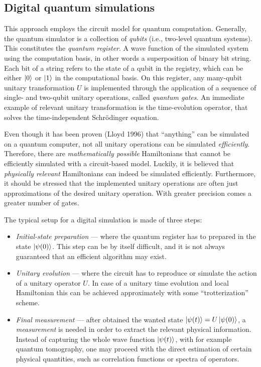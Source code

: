 
\subsection{Digital quantum simulations}
\label{sub:digital_quantum_simulations}

This approach employs the circuit model for quantum computation.
Generally, the quantum simulator is a collection of \emph{qubits} (i.e., two-level quantum systems).
This constitutes the \emph{quantum register}.
A wave function of the simulated system using the computation basis, in other words a superposition of binary bit string.
Each bit of a string refers to the state of a qubit in the registry, which can be either $\ket{0}$ or $\ket{1}$ in the computational basis.
On this register, any many-qubit unitary transformation $U$ is implemented through the application of a sequence of single- and two-qubit unitary operations, called \emph{quantum gates}.
An immediate example of relevant unitary transformation is the time-evolution operator, that solves the time-independent Schrödinger equation.

Even though it has been proven (Lloyd 1996\citneeded) that ``anything'' can be simulated on a quantum computer, not all unitary operations can be simulated \emph{efficiently}.
Therefore, there are \emph{mathematically possible} Hamiltonians that cannot be efficiently simulated with a circuit-based model.
Luckily, it is believed that \emph{physically relevant} Hamiltonians can indeed be simulated efficiently.
Furthermore, it should be stressed that the implemented unitary operations are often just approximations of the desired unitary operation.
With greater precision comes a greater number of gates.

The typical setup for a digital simulation is made of three steps:
\begin{itemize}
    \item
        \emph{Initial-state preparation} --- where the quantum register has to prepared in the state $\ket{\psi(0)}$.
        This step can be by itself difficult, and it is not always guaranteed that an efficient algorithm may exist.
    \item
        \emph{Unitary evolution} --- where the circuit has to reproduce or simulate the action of a unitary operator $U$.
        In case of a unitary time evolution and local Hamiltonian this can be achieved approximately with some ``trotterization'' scheme.
    \item
        \emph{Final measurement} --- after obtained the wanted state $\ket{\psi(t)} = U \ket{\psi(0)}$, a \emph{measurement} is needed in order to extract the relevant physical information.
        Instead of capturing the whole wave function $\ket{\psi(t)}$, with for example quantum tomography, one may proceed with the direct estimation of certain physical quantities, such as correlation functions or spectra of operators.
\end{itemize}


